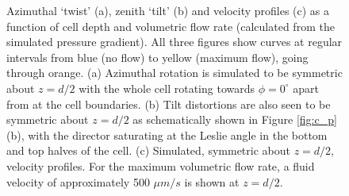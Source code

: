 \begin{figure}
\begin{center}
\end{center}
\caption[Simulated twist, tilt and velocity profiles ($\phi_0=45^{\circ}$)]{\label{fig:twist_tilt_profile} Azimuthal `twist' (a), zenith `tilt' (b) and velocity profiles (c) as a function of cell depth and volumetric flow rate (calculated from the simulated pressure gradient). All three figures show curves at regular intervals from blue (no flow) to yellow (maximum flow), going through orange. (a) Azimuthal rotation is simulated to be symmetric about $z=d/2$ with the whole cell rotating towards $\phi=0^{\circ}$ apart from at the cell boundaries. (b) Tilt distortions are also seen to be symmetric about $z=d/2$ as schematically shown in Figure \ref{fig:c_p} (b), with the director saturating at the Leslie angle in the bottom and top halves of the cell. (c) Simulated, symmetric about $z=d/2$, velocity profiles. For the maximum volumetric flow rate, a fluid velocity of approximately 500 $\mu m/s$ is shown at $z=d/2$.}
\end{figure}

